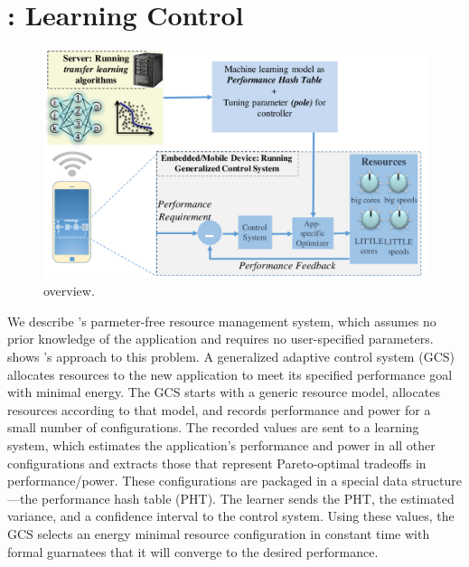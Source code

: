 \section{\SYSTEM{}: Learning Control}
\label{sec:framework}



\begin{figure}
  \includegraphics[width=\columnwidth]{figures/Overview.pdf}
  \caption{\SYSTEM{} overview.}
  \label{fig:overview}
\end{figure}


We describe \SYSTEM{}'s parmeter-free resource management system,
which assumes no prior knowledge of the application and requires no
user-specified parameters.   shows \SYSTEM{}'s
approach to this problem.  A generalized adaptive control system (GCS)
allocates resources to the new application to meet its specified
performance goal with minimal energy.  The GCS starts with a generic
resource model, allocates resources according to that model, and
records performance and power for a small number of configurations.
The recorded values are sent to a learning system, which estimates the
application's performance and power in all other configurations and
extracts those that represent Pareto-optimal tradeoffs in
performance/power.  These configurations are packaged in a special
data structure---the performance hash table (PHT).  The learner sends
the PHT, the estimated variance, and a confidence interval to the
control system.  Using these values, the GCS selects an energy minimal
resource configuration in constant time with formal guarnatees that it
will converge to the desired performance.

